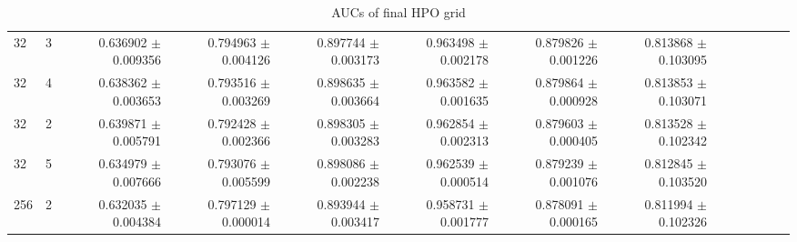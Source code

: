 \begin{table}
\begin{center}
{\begin{tabular}{llrrrrrrrrrrrr}
				  32 &     3 &  0.636902 $\pm$  0.009356 &  0.794963 $\pm$  0.004126 &  0.897744 $\pm$  0.003173 &  0.963498 $\pm$  0.002178 &  0.879826 $\pm$ 0.001226 &  0.813868 $\pm$ 0.103095 \\
				  32 &     4 &  0.638362 $\pm$  0.003653 &  0.793516 $\pm$  0.003269 &  0.898635 $\pm$  0.003664 &  0.963582 $\pm$  0.001635 &  0.879864 $\pm$ 0.000928 &  0.813853 $\pm$ 0.103071 \\
				  32 &     2 &  0.639871 $\pm$  0.005791 &  0.792428 $\pm$  0.002366 &  0.898305 $\pm$  0.003283 &  0.962854 $\pm$  0.002313 &  0.879603 $\pm$ 0.000405 &  0.813528 $\pm$ 0.102342 \\
				  32 &     5 &  0.634979 $\pm$  0.007666 &  0.793076 $\pm$  0.005599 &  0.898086 $\pm$  0.002238 &  0.962539 $\pm$  0.000514 &  0.879239 $\pm$ 0.001076 &  0.812845 $\pm$ 0.103520 \\
				 256 &     2 &  0.632035 $\pm$  0.004384 &  0.797129 $\pm$  0.000014 &  0.893944 $\pm$  0.003417 &  0.958731 $\pm$  0.001777 &  0.878091 $\pm$ 0.000165 &  0.811994 $\pm$ 0.102326 \\
				\bottomrule
				\end{tabular}}
				\caption{\label{tab:pnn_hpo_aucs}
				AUCs of final HPO grid
				  }
				  \end{center}
			\end{table}


